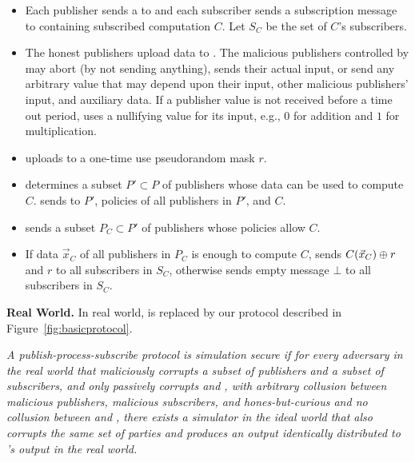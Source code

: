 \begin{itemize}[leftmargin=*,itemsep=4pt,topsep=4pt]
		\item Each publisher sends a \policy to \F and each subscriber sends a
			subscription message to \F containing subscribed computation $C$. Let $S_C$
			be the set of $C$'s subscribers. 
			
		
		\item The honest publishers upload data to \F. The malicious publishers
			controlled by \Adv may abort (by not sending anything), sends their
			actual input, or send any arbitrary value that may depend upon their
			input, other malicious publishers' input, and auxiliary data. If a
			publisher value is not received before a time out period, \F uses a
			nullifying value for its input, e.g., $0$ for addition and $1$ for
			multiplication. 
		
		\item \garbler uploads to \F a one-time use pseudorandom mask $r$.

		\item \F determines a subset $P' \subset P$ of publishers whose data can be
			used to compute $C$. \F sends to \broker $P'$, policies of all publishers
			in $P'$, and $C$.

		\item \broker sends \F a subset $P_C \subset P'$ of publishers whose
			policies allow $C$.
			
		\item If data $\vec{x}_C$ of all publishers in $P_C$ is enough to compute
			$C$, \F sends $C(\vec{x}_C) \oplus r$ and $r$ to all subscribers in $S_C$,
			otherwise \F sends empty message $\bot$ to all subscribers in $S_C$.

\end{itemize}
\vspace{6pt}
\noindent\textbf{Real World.} In real world, \F is replaced by our
protocol described in Figure~\ref{fig:basicprotocol}.\\

\begin{mdframed}[style=mydefframe]

\begin{define}
	\label{def:security}

	\textit{	A publish-process-subscribe protocol is simulation secure if for
	every adversary \Adv in the real world that maliciously corrupts a subset of
	publishers and a subset of subscribers, and only passively corrupts \broker
	and \garbler, with arbitrary collusion between malicious publishers,
	malicious subscribers, and hones-but-curious \broker and \emph{no} collusion
	between \broker and \garbler, there exists a simulator \Sim in the ideal
	world that also corrupts the same set of parties and produces an output
	identically distributed to \Adv's output in the real world.  
	}

\end{define}

\end{mdframed}
